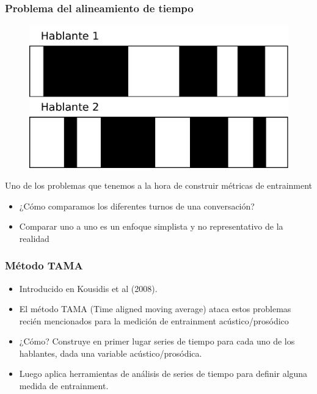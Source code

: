 \begin{frame}
  \frametitle{Problema del alineamiento de tiempo}

  \begin{figure}[t]
    \includegraphics[scale=0.40]{images/conversation_turns.pdf}
  \end{figure}
  Uno de los problemas que tenemos a la hora de construir métricas de entrainment

  \begin{itemize}
    \item ¿Cómo comparamos los diferentes turnos de una conversación?
    \item Comparar uno a uno es un enfoque simplista y no representativo de la realidad
  \end{itemize}
\end{frame}


\begin{frame}
  \frametitle{Método TAMA}
  \begin{itemize}
    \item Introducido en Kousidis et al (2008).
    \item El método TAMA (Time aligned moving average) ataca estos problemas recién mencionados para la medición de entrainment acústico/prosódico
    \item ¿Cómo? Construye en primer lugar series de tiempo para cada uno de los hablantes, dada una variable acústico/prosódica.
    \item Luego aplica herramientas de análisis de series de tiempo para definir alguna medida de entrainment.
  \end{itemize}
\end{frame}


